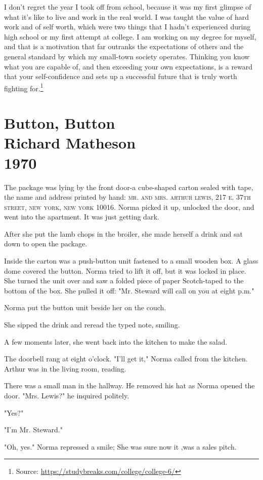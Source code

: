 \documentclass[10pt,a4paper]{book}
\newcommand{\source}[1]{\footnote{Source: \href{#1}{#1}}}
\newcommand{\glos}[3]{\dotuline{#1}\marginpar{\scriptsize\textit{#3} #2}}
\newcommand{\newentry}[3]{
		\begingroup
		\chapter*{
		\nolinenumbers
		\plantinc\color{hgblue} #1\\\Large\normalfont\color{black} #2\\\normalsize #3
		}
		\endgroup
	}
\begin{document}
I don’t regret the year I took off from school, because it was my first glimpse of what it’s like to live and work in the real world. I was taught the value of hard work and of self worth, which were two things that I hadn’t experienced during high school or my first attempt at college. I am working on my degree for myself, and that is a motivation that far outranks the expectations of others and the general standard by which my small-town society operates. Thinking you know what you are capable of, and then exceeding your own expectations, is a reward that \glos{fuels}{(her) booste}{vb.} your self-confidence and sets up a successful future that is truly worth fighting for.\source{https://studybreaks.com/college/college-6/}


\newentry{Button, Button}{Richard Matheson}{1970}
\linenumbers \noindent The package was lying by the front door-a cube-shaped carton sealed with tape, the name and address printed by hand: \textsc{mr. and mrs. arthur lewis, 217 e. 37th street, new york, new york 10016}. Norma picked it up, unlocked the door, and went into the apartment. It was just getting dark.

After she put the lamb chops in the broiler, she made herself a drink and sat down to open the package.

Inside the carton was a push-button unit fastened to a small wooden box. A glass dome covered the button. Norma tried to lift it off, but it was locked in place. She turned the unit over and saw a folded piece of paper Scotch-taped to the bottom of the box. She pulled it off: "Mr. Steward will call on you at eight p.m."

Norma put the button unit beside her on the couch.

She sipped the drink and reread the typed note, smiling.

A few moments later, she went back into the kitchen to make the salad.

The doorbell rang at eight o'clock. "I'll get it," Norma called from the kitchen. Arthur was in the living room, reading.

There was a small man in the hallway. He removed his hat as Norma opened the door. "Mrs. Lewis?" he inquired politely.

"Yes?"

"I'm Mr. Steward."

"Oh, yes." Norma repressed a smile; She was sure now it ,was a sales pitch.
\end{document}
